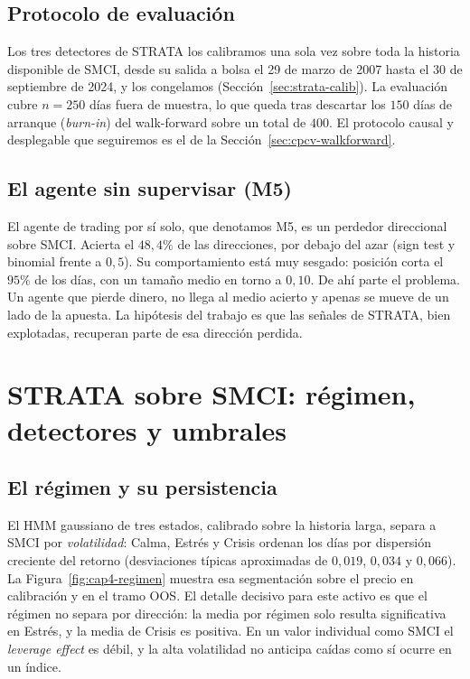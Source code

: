 \subsection{Protocolo de evaluación}
\label{sec:smci-protocolo}

Los tres detectores de STRATA los calibramos una sola vez sobre toda la historia disponible de SMCI, desde su salida a bolsa el 29 de marzo de 2007 hasta el 30 de septiembre de 2024, y los congelamos (Sección~\ref{sec:strata-calib}). La evaluación cubre $n = 250$ días fuera de muestra, lo que queda tras descartar los $150$ días de arranque (\emph{burn-in}) del walk-forward sobre un total de $400$. El protocolo causal y desplegable que seguiremos es el de la Sección~\ref{sec:cpcv-walkforward}.

\subsection{El agente sin supervisar (M5)}
\label{sec:smci-m5}

El agente de trading por sí solo, que denotamos M5, es un perdedor direccional sobre SMCI. Acierta el $48{,}4\%$ de las direcciones, por debajo del azar (sign test y binomial frente a $0{,}5$). Su comportamiento está muy sesgado: posición corta el $95\%$ de los días, con un tamaño medio en torno a $0{,}10$. De ahí parte el problema. Un agente que pierde dinero, no llega al medio acierto y apenas se mueve de un lado de la apuesta. La hipótesis del trabajo es que las señales de STRATA, bien explotadas, recuperan parte de esa dirección perdida.

\section{STRATA sobre SMCI: régimen, detectores y umbrales}
\label{sec:smci-strata}

\subsection{El régimen y su persistencia}
\label{sec:smci-regimen}

El HMM gaussiano de tres estados, calibrado sobre la historia larga, separa a SMCI por \emph{volatilidad}: Calma, Estrés y Crisis ordenan los días por dispersión creciente del retorno (desviaciones típicas aproximadas de $0{,}019$, $0{,}034$ y $0{,}066$). La Figura~\ref{fig:cap4-regimen} muestra esa segmentación sobre el precio en calibración y en el tramo OOS. El detalle decisivo para este activo es que el régimen no separa por dirección: la media por régimen solo resulta significativa en Estrés, y la media de Crisis es positiva. En un valor individual como SMCI el \emph{leverage effect} es débil, y la alta volatilidad no anticipa caídas como sí ocurre en un índice.

